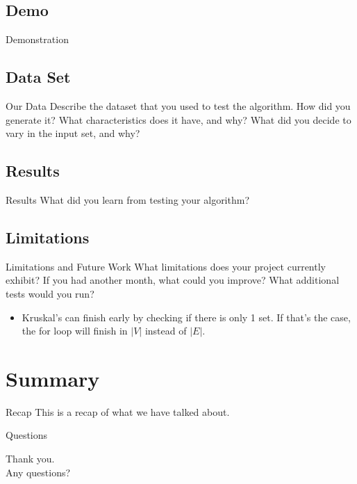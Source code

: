 \documentclass{beamer}
\begin{document}
\subsection{Demo}
\begin{frame}{Demonstration}
\end{frame}

\subsection{Data Set}
\begin{frame}{Our Data}
    Describe the dataset that you used to test the algorithm. How did you
    generate it? What characteristics does it have, and why? What did you
    decide to vary in the input set, and why?
\end{frame}

\subsection{Results}
\begin{frame}{Results}
    What did you learn from testing your algorithm?
\end{frame}

\subsection{Limitations}
\begin{frame}{Limitations and Future Work}
    What limitations does your project currently exhibit? If you had another
    month, what could you improve? What additional tests would you run?

    \begin{itemize}
    \item Kruskal's can finish early by checking if there is only 1 set. If
    that's the case, the for loop will finish in $|V|$ instead of $|E|$.
    \end{itemize}
\end{frame}


\section{Summary}\frame{\sectionpage}
\begin{frame}{Recap}
    This is a recap of what we have talked about.
\end{frame}

\begin{frame}{Questions}
    \begin{center}
    Thank you.\\
    Any questions?
    \end{center}
\end{frame}
\end{document}
